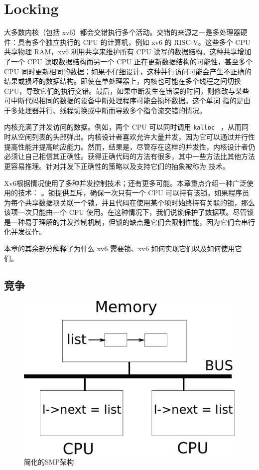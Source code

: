 

   \chapter{Locking}   
    \label{CH:LOCK}     

大多数内核（包括 xv6）都会交错执行多个活动。交错的来源之一是多处理器硬件：具有多个独立执行的 CPU 的计算机，例如 xv6 的 RISC-V。这些多个 CPU 共享物理 RAM，xv6 利用共享来维护所有 CPU 读写的数据结构。这种共享增加了一个 CPU 读取数据结构而另一个 CPU 正在更新数据结构的可能性，甚至多个 CPU 同时更新相同的数据；如果不仔细设计，这种并行访问可能会产生不正确的结果或损坏的数据结构。即使在单处理器上，内核也可能在多个线程之间切换 CPU，导致它们的执行交错。最后，如果中断发生在错误的时间，则修改与某些可中断代码相同的数据的设备中断处理程序可能会损坏数据。这个单词
        指的是由于多处理器并行、线程切换或中断而导致多个指令流交错的情况。  

内核充满了并发访问的数据。例如，两个 CPU 可以同时调用  {    \tt    kalloc   }  ，从而同时从空闲列表的头部弹出。内核设计者喜欢允许大量并发，因为它可以通过并行性提高性能并提高响应能力。然而，结果是，尽管存在这样的并发性，内核设计者仍必须让自己相信其正确性。获得正确代码的方法有很多，其中一些方法比其他方法更容易推理。针对并发下正确性的策略以及支持它们的抽象被称为        技术。  

Xv6根据情况使用了多种并发控制技术；还有更多可能。本章重点介绍一种广泛使用的技术：      。锁提供互斥，确保一次只有一个 CPU 可以持有该锁。如果程序员为每个共享数据项关联一个锁，并且代码在使用某个项时始终持有关联的锁，那么该项一次只能由一个 CPU 使用。在这种情况下，我们说锁保护了数据项。尽管锁是一种易于理解的并发控制机制，但锁的缺点是它们会限制性能，因为它们会串行化并发操作。  

本章的其余部分解释了为什么 xv6 需要锁、xv6 如何实现它们以及如何使用它们。
    \section{竞争  }     

   \begin{figure}[t]
\center
\includegraphics[scale=0.8]{fig/smp.pdf}
\caption{简化的SMP架构  }
\label{fig:smp}
\end{figure}     

